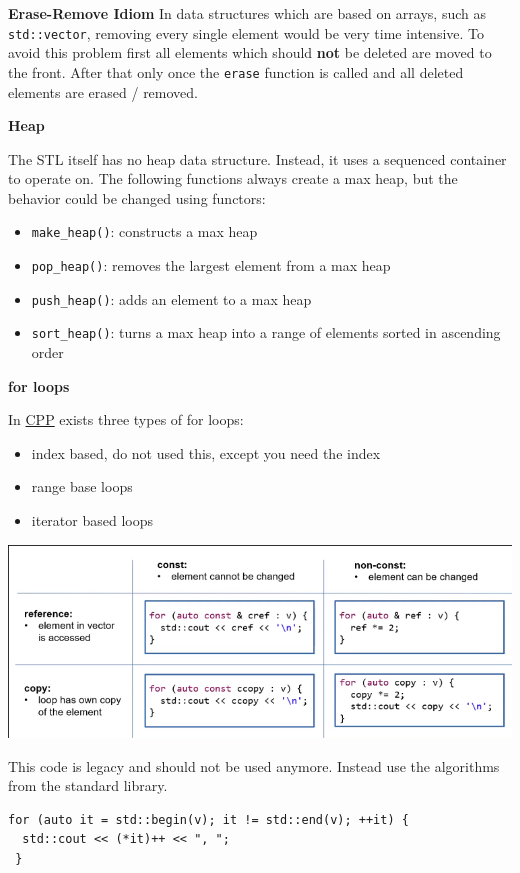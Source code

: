 \documentclass[11pt,twoside,landscape]{article}
\begin{document}
\begin{multicols}{3}
\textbf{Erase-Remove Idiom}
In data structures which are based on arrays, such as \texttt{std::vector}, removing every single element would be very time intensive.
To avoid this problem first all elements which should \textbf{not} be deleted are moved to the front.
After that only once the \texttt{erase} function is called and all deleted elements are erased / removed.

\textbf{Heap}

The STL itself has no heap data structure.
Instead, it uses a sequenced container to operate on.
The following functions always create a max heap, but the behavior could be changed using functors:
\begin{itemize}
\item \texttt{make\_heap()}: constructs a max heap
\item \texttt{pop\_heap()}: removes the largest element from a max heap
\item \texttt{push\_heap()}: adds an element to a max heap
\item \texttt{sort\_heap()}: turns a max heap into a range of elements sorted in ascending order
\end{itemize}

\textbf{for loops}

In \href{../../../roam/20210920103243-c.org}{CPP} exists three types of for loops:
\begin{itemize}
\item index based, do not used this, except you need the index
\item range base loops
\item iterator based loops
\end{itemize}


{
\begin{center}
\includegraphics[width=.9\linewidth]{img/ranged_based_for_loop.png}
\end{center}
}


This code is legacy and should not be used anymore.
Instead use the algorithms from the standard library.
\lstset{language=c++,label= ,caption= ,captionpos=b,numbers=none}
\begin{lstlisting}
for (auto it = std::begin(v); it != std::end(v); ++it) {
  std::cout << (*it)++ << ", ";
 }
\end{lstlisting}


\end{multicols}
\end{document}
